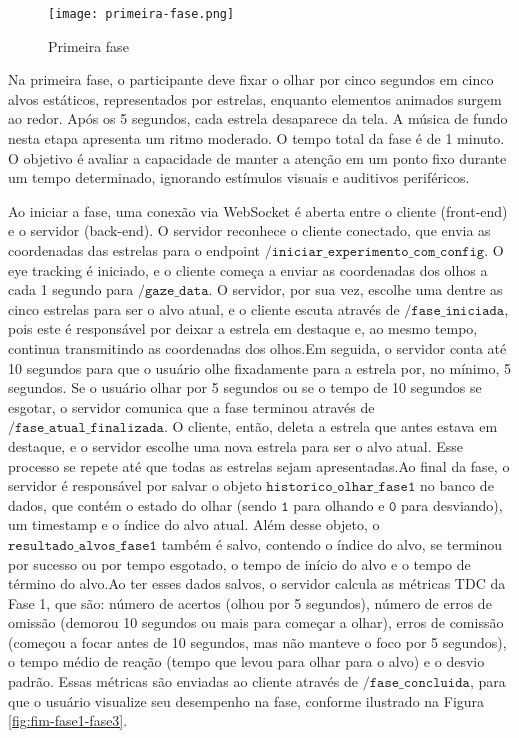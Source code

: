 \begin{figure}[H]
    \centering
    \caption{Primeira fase}%
    \label{fig:primeira-fase}
    \texttt{[image: primeira-fase.png]}%
\end{figure}

Na primeira fase, o participante deve fixar o olhar por cinco segundos em cinco alvos estáticos,
representados por estrelas, enquanto elementos animados surgem ao redor. Após os 5 segundos,
cada estrela desaparece da tela. A música de fundo nesta etapa apresenta um ritmo moderado. O tempo total da fase é de 1 minuto. O
objetivo é avaliar a capacidade de manter a atenção em um ponto fixo durante um tempo determinado, ignorando estímulos visuais e auditivos periféricos.

Ao iniciar a fase, uma conexão via WebSocket é aberta entre o cliente (front-end) e o servidor (back-end). O servidor reconhece o cliente conectado, que envia as coordenadas das estrelas para o endpoint $\texttt{/iniciar\_experimento\_com\_config}$. O eye tracking é iniciado, e o cliente começa a enviar as coordenadas dos olhos a cada 1 segundo para $\texttt{/gaze\_data}$. O servidor, por sua vez, escolhe uma dentre as cinco estrelas para ser o alvo atual, e o cliente escuta através de $\texttt{/fase\_iniciada}$, pois este é responsável por deixar a estrela em destaque e, ao mesmo tempo, continua transmitindo as coordenadas dos olhos.Em seguida, o servidor conta até 10 segundos para que o usuário olhe fixadamente para a estrela por, no mínimo, 5 segundos. Se o usuário olhar por 5 segundos ou se o tempo de 10 segundos se esgotar, o servidor comunica que a fase terminou através de $\texttt{/fase\_atual\_finalizada}$. O cliente, então, deleta a estrela que antes estava em destaque, e o servidor escolhe uma nova estrela para ser o alvo atual. Esse processo se repete até que todas as estrelas sejam apresentadas.Ao final da fase, o servidor é responsável por salvar o objeto $\texttt{historico\_olhar\_fase1}$ no banco de dados, que contém o estado do olhar (sendo $\texttt{1}$ para olhando e $\texttt{0}$ para desviando), um timestamp e o índice do alvo atual. Além desse objeto, o $\texttt{resultado\_alvos\_fase1}$ também é salvo, contendo o índice do alvo, se terminou por sucesso ou por tempo esgotado, o tempo de início do alvo e o tempo de término do alvo.Ao ter esses dados salvos, o servidor calcula as métricas TDC da Fase 1, que são: número de acertos (olhou por 5 segundos), número de erros de omissão (demorou 10 segundos ou mais para começar a olhar), erros de comissão (começou a focar antes de 10 segundos, mas não manteve o foco por 5 segundos), o tempo médio de reação (tempo que levou para olhar para o alvo) e o desvio padrão. Essas métricas são enviadas ao cliente através de $\texttt{/fase\_concluida}$, para que o usuário visualize seu desempenho na fase, conforme ilustrado na Figura \ref{fig:fim-fase1-fase3}.

